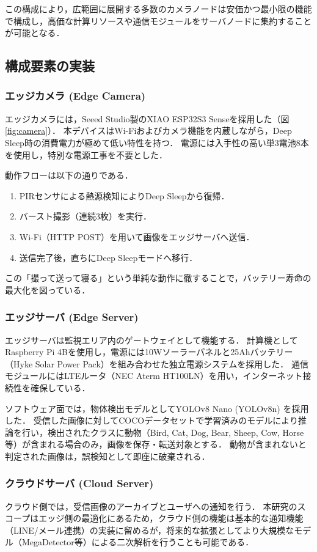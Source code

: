 \documentclass[technicalreport]{ieicej}
\begin{document}
この構成により，広範囲に展開する多数のカメラノードは安価かつ最小限の機能で構成し，高価な計算リソースや通信モジュールをサーバノードに集約することが可能となる．

\subsection{構成要素の実装}
\subsubsection{エッジカメラ (Edge Camera)}
エッジカメラには，Seeed Studio製のXIAO ESP32S3 Senseを採用した（図\ref{fig:camera}）．
本デバイスはWi-Fiおよびカメラ機能を内蔵しながら，Deep Sleep時の消費電力が極めて低い特性を持つ．
電源には入手性の高い単3電池8本を使用し，特別な電源工事を不要とした．

動作フローは以下の通りである．
\begin{enumerate}
  \item PIRセンサによる熱源検知によりDeep Sleepから復帰．
  \item バースト撮影（連続3枚）を実行．
  \item Wi-Fi（HTTP POST）を用いて画像をエッジサーバへ送信．
  \item 送信完了後，直ちにDeep Sleepモードへ移行．
\end{enumerate}
この「撮って送って寝る」という単純な動作に徹することで，バッテリー寿命の最大化を図っている．

\subsubsection{エッジサーバ (Edge Server)}
エッジサーバは監視エリア内のゲートウェイとして機能する．
計算機としてRaspberry Pi 4Bを使用し，電源には10Wソーラーパネルと25Ahバッテリー（Hyke Solar Power Pack）を組み合わせた独立電源システムを採用した．
通信モジュールにはLTEルータ（NEC Aterm HT100LN）を用い，インターネット接続性を確保している．

ソフトウェア面では，物体検出モデルとしてYOLOv8 Nano (YOLOv8n) を採用した．
受信した画像に対してCOCOデータセットで学習済みのモデルにより推論を行い，検出されたクラスに動物（Bird, Cat, Dog, Bear, Sheep, Cow, Horse等）が含まれる場合のみ，画像を保存・転送対象とする．
動物が含まれないと判定された画像は，誤検知として即座に破棄される．

\subsubsection{クラウドサーバ (Cloud Server)}
クラウド側では，受信画像のアーカイブとユーザへの通知を行う．
本研究のスコープはエッジ側の最適化にあるため，クラウド側の機能は基本的な通知機能（LINE/メール連携）の実装に留めるが，将来的な拡張としてより大規模なモデル（MegaDetector等）による二次解析を行うことも可能である．
\end{document}
